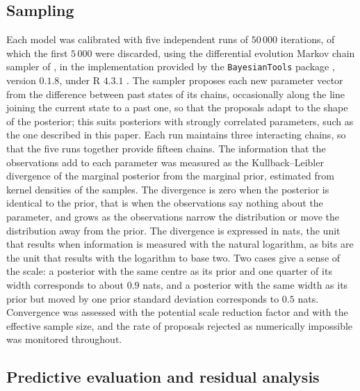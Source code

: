 \documentclass[11pt]{article}
\begin{document}
\subsection{Sampling}

Each model was calibrated with five independent runs of $50\,000$ iterations, of which
the first $5\,000$ were discarded, using the differential evolution Markov chain sampler
of \citet{terBraakVrugt2008}, in the implementation provided by the
\texttt{BayesianTools} package \citep{BayesianTools}, version $0.1.8$, under R $4.3.1$
\citep{RCore}.
The sampler proposes each new parameter vector from the difference between past
states of its chains, occasionally along the line joining the current state to a past
one, so that the proposals adapt to the shape of the posterior; this suits posteriors
with strongly correlated parameters, such as the one described in this paper. Each run
maintains three interacting chains, so that the five runs together provide fifteen
chains.
The information that the observations add to each parameter was measured as the
Kullback--Leibler divergence of the marginal posterior from the marginal prior,
estimated from kernel densities of the samples. The divergence is zero when the
posterior is identical to the prior, that is when the observations say nothing about
the parameter, and grows as the observations narrow the distribution or move the
distribution away from the prior. The divergence is expressed in nats, the unit that
results when information is measured with the natural logarithm, as bits are the unit
that results with the logarithm to base two. Two cases give a sense of the scale: a
posterior with the same centre as its prior and one quarter of its width corresponds to
about $0.9$ nats, and a posterior with the same width as its prior but moved by one
prior standard deviation corresponds to $0.5$ nats. Convergence
was assessed with the potential scale reduction factor and with the effective
sample size, and the rate of proposals rejected as numerically impossible was
monitored throughout.

\subsection{Predictive evaluation and residual analysis}
\end{document}
